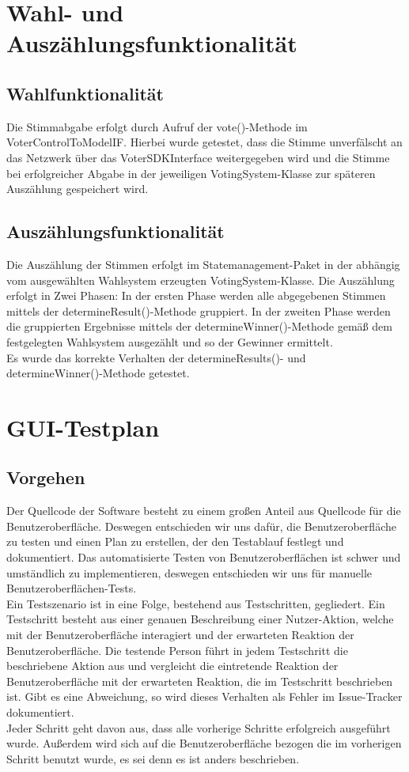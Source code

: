 \documentclass[parskip=full]{scrartcl}
\begin{document}
\section{Wahl- und Auszählungsfunktionalität}
\subsection{Wahlfunktionalität}
Die Stimmabgabe erfolgt durch Aufruf der vote()-Methode im VoterControlToModelIF.
Hierbei wurde getestet, dass die Stimme unverfälscht an das Netzwerk über das VoterSDKInterface weitergegeben wird und die Stimme bei erfolgreicher Abgabe in der jeweiligen VotingSystem-Klasse zur späteren Auszählung gespeichert wird.


\subsection{Auszählungsfunktionalität}
Die Auszählung der Stimmen erfolgt im Statemanagement-Paket in der abhängig vom ausgewählten Wahlsystem erzeugten VotingSystem-Klasse.
Die Auszählung erfolgt in Zwei Phasen: In der ersten Phase werden alle abgegebenen Stimmen mittels der determineResult()-Methode gruppiert.
In der zweiten Phase werden die gruppierten Ergebnisse mittels der determineWinner()-Methode gemäß dem festgelegten Wahlsystem ausgezählt und so der Gewinner ermittelt.\\
Es wurde das korrekte Verhalten der determineResults()- und determineWinner()-Methode getestet.

\section{GUI-Testplan}
\subsection{Vorgehen}
Der Quellcode der Software besteht zu einem großen Anteil aus Quellcode für die Benutzeroberfläche. Deswegen entschieden wir uns dafür, die Benutzeroberfläche zu testen und einen Plan zu erstellen, der den Testablauf festlegt und dokumentiert. Das automatisierte Testen von Benutzeroberflächen ist schwer und umständlich zu implementieren, deswegen entschieden wir uns für manuelle Benutzeroberflächen-Tests.
\\
Ein Testszenario ist in eine Folge, bestehend aus Testschritten, gegliedert. Ein Testschritt besteht aus einer genauen Beschreibung einer Nutzer-Aktion, welche mit der Benutzeroberfläche interagiert und der erwarteten Reaktion der Benutzeroberfläche. Die testende Person führt in jedem Testschritt die beschriebene Aktion aus und vergleicht die eintretende Reaktion der Benutzeroberfläche mit der erwarteten Reaktion, die im Testschritt beschrieben ist. Gibt es eine Abweichung, so wird dieses Verhalten als Fehler im Issue-Tracker dokumentiert.
\\
Jeder Schritt geht davon aus, dass alle vorherige Schritte erfolgreich ausgeführt wurde. Außerdem wird sich auf die Benutzeroberfläche bezogen die im vorherigen Schritt benutzt wurde, es sei denn es ist anders beschrieben.
\end{document}
